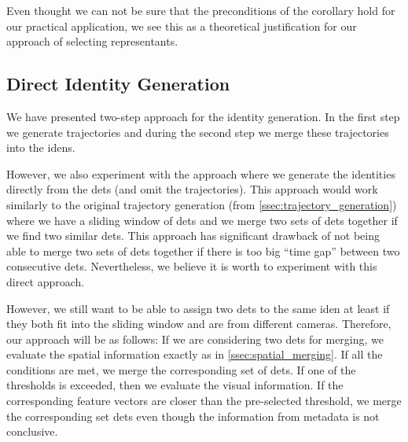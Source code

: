 Even thought we can not be sure that the preconditions of the corollary hold for our practical application, we see this as a theoretical justification for our approach of selecting representants. 




\subsection{Direct Identity Generation}

We have presented two-step approach for the identity generation. In the first step we generate
trajectories and during the second step we merge these trajectories into
the \glspl{iden}.

However, we also experiment with the approach where we generate the identities directly from the \glspl{det} (and omit the trajectories). This approach would work similarly to the original trajectory generation (from \autoref{ssec:trajectory_generation}) where we have a sliding window of \glspl{det} and we merge two sets of \glspl{det} together if we find two similar \glspl{det}. This approach has significant drawback of not being able to merge two sets of \glspl{det} together if there is too big ``time gap'' between two consecutive \glspl{det}. Nevertheless, we believe it is worth to experiment with this direct approach.

However, we still want to be able to assign two \glspl{det} to the
same \gls{iden} at least if they both fit into the sliding window and are from different cameras. Therefore, our approach will be as follows: If we are
considering two \glspl{det} for merging, we evaluate the spatial information
exactly as in \autoref{ssec:spatial_merging}. If all the conditions are met,
we merge the corresponding set of \glspl{det}. If one of the thresholds is
exceeded, then we evaluate the visual information. If the corresponding feature
vectors are closer than the pre-selected threshold, we merge the corresponding set \glspl{det} even though the information from metadata is not conclusive.

